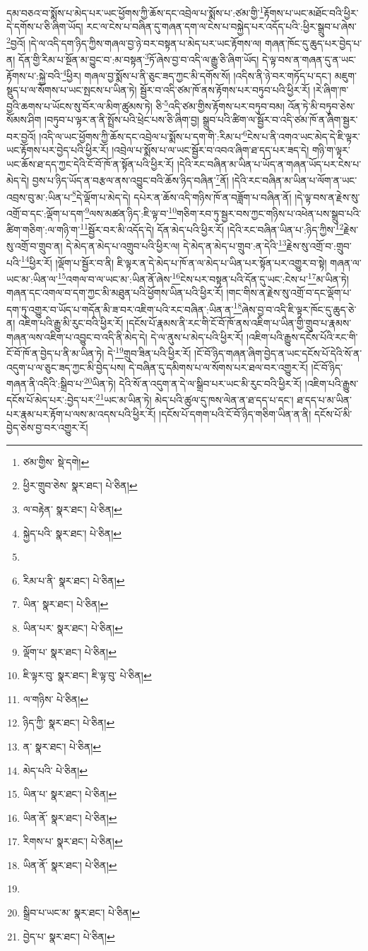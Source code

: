 དམ་བཅའ་བ་སྨོས་པ་མེད་པར་ཡང་ཕྱོགས་ཀྱི་ཆོས་དང་འབྲེལ་པ་སྨོས་པ་:ཙམ་གྱི་\footnote{ཙམ་གྱིས་  སྡེ་དགེ། }རྟོགས་པ་ཡང་མཐོང་བའི་ཕྱིར་དེ་དགོས་པ་ཅི་ཞིག་ཡོད། རང་ལ་ངེས་པ་བཞིན་དུ་གཞན་དག་ལ་ངེས་པ་བསྐྱེད་པར་འདོད་པའི་:ཕྱིར་སྒྲུབ་པ་ཞེས་\footnote{ཕྱིར་གྲུབ་ཅེས་  སྣར་ཐང་།  པེ་ཅིན། }བྱའོ། །དེ་ལ་འདི་དག་ཉིད་ཀྱིས་གཞལ་བྱ་ཉེ་བར་བསྟན་པ་མེད་པར་ཡང་རྟོགས་ལ། གཞན་ཁོང་དུ་ཆུད་པར་བྱེད་པ་ན། དོན་གྱི་རིམ་པ་སྔོན་མ་བྱུང་བ་:མ་བསྟན་\footnote{ལ་བརྟེན་  སྣར་ཐང་།  པེ་ཅིན། }ཏོ་ཞེས་བྱ་བ་འདི་ལ་རྒྱུ་ཅི་ཞིག་ཡོད། དེ་ལྟ་བས་ན་གཞན་དུ་ན་ཡང་རྟོགས་པ་:སྐྱེ་བའི་\footnote{སྐྱེད་པའི་  སྣར་ཐང་།  པེ་ཅིན། }ཕྱིར། གཞལ་བྱ་སྨོས་པ་ནི་ཅུང་ཟད་ཀྱང་མི་དགོས་སོ། །འདིས་ནི་ཉེ་བར་གཏོད་པ་དང་། མཇུག་སྡུད་པ་ལ་སོགས་པ་ཡང་སྤངས་པ་ཡིན་ཏེ། སྦྱོར་བ་འདི་ཙམ་ཁོ་ནས་རྟོགས་པར་བཏུབ་པའི་ཕྱིར་རོ། །རེ་ཞིག་ཁ་བྱའི་ཆགས་པ་ཡོངས་སུ་བོར་ལ་མིག་ཚུམས་ཏེ། ཅི་\footnote{}འདི་ཙམ་གྱིས་རྟོགས་པར་བཏུབ་བམ། འོན་ཏེ་མི་བཏུབ་ཅེས་སོམས་ཤིག །བཏུབ་པ་ལྟར་ན་ནི་སྤྲོས་པའི་ཕྲེང་པས་ཅི་ཞིག་བྱ། སྒྲུབ་པའི་ཚིག་ལ་སྦྱོར་བ་འདི་ཙམ་ཁོ་ན་ཞིག་སྦྱར་བར་བྱའོ། །འདི་ལ་ཡང་ཕྱོགས་ཀྱི་ཆོས་དང་འབྲེལ་པ་སྨོས་པ་དག་གི་:རིམ་པ་\footnote{རིམ་པ་ནི་  སྣར་ཐང་།  པེ་ཅིན། }ངེས་པ་ནི་འགའ་ཡང་མེད་དེ་ཇི་ལྟར་ཡང་རྟོགས་པར་བྱེད་པའི་ཕྱིར་རོ། །འབྲེལ་པ་སྨོས་པ་ལ་ཡང་སྦྱོར་བ་འབའ་ཞིག་ཐ་དད་པར་ཟད་དེ། གཉི་ག་ལྟར་ཡང་ཆོས་ཐ་དད་ཀྱང་དེའི་ངོ་བོ་ཁོ་ན་སྟོན་པའི་ཕྱིར་རོ། །དེའི་རང་བཞིན་མ་ཡིན་པ་ཡོད་ན་གཞན་ཡོད་པར་ངེས་པ་མེད་དེ། བྱས་པ་ཉིད་ཡོད་ན་བརྩལ་ནས་འབྱུང་བའི་ཆོས་ཉིད་བཞིན་\footnote{ཡིན་  སྣར་ཐང་།  པེ་ཅིན། }ནོ། །དེའི་རང་བཞིན་མ་ཡིན་པ་ལོག་ན་ཡང་འབྲས་བུ་མ་:ཡིན་པ་\footnote{ཡིན་པར་  སྣར་ཐང་།  པེ་ཅིན། }དེ་ལྡོག་པ་མེད་དེ། དཔེར་ན་ཆོས་འདི་གཉིས་ཁོ་ན་བཟློག་པ་བཞིན་ནོ། །དེ་ལྟ་བས་ན་རྗེས་སུ་འགྲོ་བ་དང་:ལྡོག་པ་དག་\footnote{ལྡོག་པ་  སྣར་ཐང་།  པེ་ཅིན། }ལས་མཚན་ཉིད་:ཇི་ལྟ་བ་\footnote{ཇི་ལྟར་བུ་  སྣར་ཐང་། ཇི་ལྟ་བུ་  པེ་ཅིན། }གཅིག་རབ་ཏུ་སྦྱར་བས་ཀྱང་གཉིས་པ་འཕེན་པས་སྒྲུབ་པའི་ཚིག་གཅིག་:ལ་གཉི་ག་\footnote{ལ་གཉིས་  པེ་ཅིན། }སྦྱོར་བར་མི་འདོད་དེ། དོན་མེད་པའི་ཕྱིར་རོ། །དེའི་རང་བཞིན་ཡིན་པ་:ཉིད་ཀྱིས་\footnote{ཉིད་ཀྱི་  སྣར་ཐང་།  པེ་ཅིན། }རྗེས་སུ་འགྲོ་བ་གྲུབ་ན། དེ་མེད་ན་མེད་པ་འགྲུབ་པའི་ཕྱིར་ལ། དེ་མེད་ན་མེད་པ་གྲུབ་:ན་དེའི་\footnote{ན་  སྣར་ཐང་།  པེ་ཅིན། }རྗེས་སུ་འགྲོ་བ་:གྲུབ་པའི་\footnote{མེད་པའི་  པེ་ཅིན། }ཕྱིར་རོ། །ལྡོག་པ་སྦྱོར་བ་ནི། ཇི་ལྟར་ན་དེ་མེད་པ་ཁོ་ན་ལ་མེད་པ་ཡིན་པར་སྟོན་པར་འགྱུར་བ་སྟེ། གཞན་ལ་ཡང་མ་:ཡིན་ལ་\footnote{ཡིན་པ་  སྣར་ཐང་།  པེ་ཅིན། }འགལ་བ་ལ་ཡང་མ་:ཡིན་ནོ་ཞེས་\footnote{ཡིན་ནོ་  སྣར་ཐང་།  པེ་ཅིན། }ངེས་པར་བསྟན་པའི་དོན་དུ་ཡང་:ངེས་པ་\footnote{རིགས་པ་  སྣར་ཐང་།  པེ་ཅིན། }མ་ཡིན་ཏེ། གཞན་དང་འགལ་བ་དག་ཀྱང་མི་མཐུན་པའི་ཕྱོགས་ཡིན་པའི་ཕྱིར་རོ། །གང་གིས་ན་རྗེས་སུ་འགྲོ་བ་དང་ལྡོག་པ་དག་ཏུ་འགྱུར་བ་ཡོད་པ་གདོན་མི་ཟ་བར་འཇིག་པའི་རང་བཞིན་:ཡིན་ན་\footnote{ཡིན་ནོ་  སྣར་ཐང་།  པེ་ཅིན། }ཞེས་བྱ་བ་འདི་ཇི་ལྟར་ཁོང་དུ་ཆུད་ཅེ་ན། འཇིག་པའི་རྒྱུ་མི་རུང་བའི་ཕྱིར་རོ། །དངོས་པོ་རྣམས་ནི་རང་གི་ངོ་བོ་ཁོ་ནས་འཇིག་པ་ཡིན་གྱི་གྲུབ་པ་རྣམས་གཞན་ལས་འཇིག་པ་འབྱུང་བ་འདི་ནི་མེད་དེ། དེ་ལ་ནུས་པ་མེད་པའི་ཕྱིར་རོ། །འཇིག་པའི་རྒྱུས་དངོས་པོའི་རང་གི་ངོ་བོ་ཁོ་ན་བྱེད་པ་ནི་མ་ཡིན་ཏེ། དེ་\footnote{}གྲུབ་ཟིན་པའི་ཕྱིར་རོ། །ངོ་བོ་ཉིད་གཞན་ཞིག་བྱེད་ན་ཡང་དངོས་པོ་དེའི་སོ་ན་འདུག་པ་ལ་ཅུང་ཟད་ཀྱང་མི་བྱེད་པས། དེ་བཞིན་དུ་དམིགས་པ་ལ་སོགས་པར་ཐལ་བར་འགྱུར་རོ། །ངོ་བོ་ཉིད་གཞན་ནི་འདིའི་:སྒྲིབ་པ་\footnote{སྒྲིབ་པ་ཡང་མ་  སྣར་ཐང་།  པེ་ཅིན། }ཡིན་ཏེ། དེའི་སོ་ན་འདུག་ན་དེ་ལ་སྒྲིབ་པར་ཡང་མི་རུང་བའི་ཕྱིར་རོ། །འཇིག་པའི་རྒྱུས་དངོས་པོ་མེད་པར་:བྱེད་པར་\footnote{བྱེད་པ་  སྣར་ཐང་།  པེ་ཅིན། }ཡང་མ་ཡིན་ཏེ། མེད་པའི་ཚུལ་དུ་ཁས་ལེན་ན་ཐ་དད་པ་དང་། ཐ་དད་པ་མ་ཡིན་པར་རྣམ་པར་རྟོག་པ་ལས་མ་འདས་པའི་ཕྱིར་རོ། །དངོས་པོ་དགག་པའི་ངོ་བོ་ཉིད་གཅིག་ཡིན་ན་ནི། དངོས་པོ་མི་བྱེད་ཅེས་བྱ་བར་འགྱུར་རོ། 